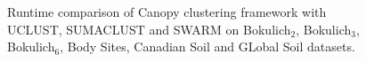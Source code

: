 \documentclass[10pt, conference, compsocconf]{IEEEtran}
\begin{document}
\begin{figure}[t]
	\begin{minipage}[t]{0.5\linewidth}
	\end{minipage}%
	\hfill%
	\begin{minipage}[t]{0.5\linewidth}
	\end{minipage}
	
	\caption{Runtime comparison of Canopy clustering framework with UCLUST, SUMACLUST and SWARM on Bokulich$_2$, Bokulich$_3$, Bokulich$_6$, Body Sites, Canadian Soil and GLobal Soil datasets.}

\end{figure}
\end{document}
